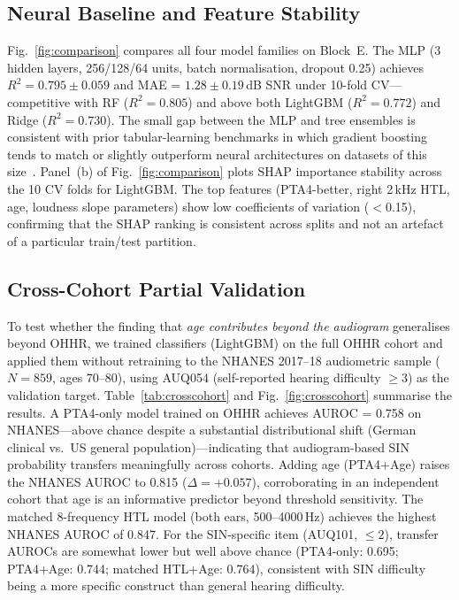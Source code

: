 \documentclass[conference]{IEEEtran}
\begin{document}
\subsection{Neural Baseline and Feature Stability}

Fig.~\ref{fig:comparison} compares all four model families on Block~E.
The MLP (3 hidden layers, 256/128/64 units, batch normalisation, dropout
0.25) achieves $R^2 = 0.795 \pm 0.059$ and MAE = $1.28 \pm 0.19$\,dB SNR
under 10-fold CV---competitive with RF ($R^2=0.805$) and above both
LightGBM ($R^2=0.772$) and Ridge ($R^2=0.730$).  The small gap between the
MLP and tree ensembles is consistent with prior tabular-learning benchmarks
in which gradient boosting tends to match or slightly outperform neural
architectures on datasets of this size~\cite{Gorishniy2021Revisiting}.
Panel~(b) of Fig.~\ref{fig:comparison} plots SHAP importance stability
across the 10 CV folds for LightGBM.  The top features (PTA4-better, right
2\,kHz HTL, age, loudness slope parameters) show low coefficients of
variation ($<$0.15), confirming that the SHAP ranking is consistent across
splits and not an artefact of a particular train/test partition.

\subsection{Cross-Cohort Partial Validation}

To test whether the finding that \emph{age contributes beyond the audiogram}
generalises beyond OHHR, we trained classifiers (LightGBM) on the full OHHR
cohort and applied them without retraining to the NHANES 2017--18 audiometric
sample ($N=859$, ages 70--80), using AUQ054
(self-reported hearing difficulty $\geq$3) as the validation target.
Table~\ref{tab:crosscohort} and Fig.~\ref{fig:crosscohort} summarise the
results.  A PTA4-only model trained on OHHR achieves AUROC = 0.758 on
NHANES---above chance despite a substantial distributional shift (German
clinical vs.\ US general population)---indicating that audiogram-based SIN
probability transfers meaningfully across cohorts.  Adding age (PTA4+Age)
raises the NHANES AUROC to 0.815 ($\Delta = +0.057$), corroborating in an
independent cohort that age is an informative predictor beyond threshold
sensitivity.  The matched 8-frequency HTL model (both ears, 500--4000\,Hz)
achieves the highest NHANES AUROC of 0.847.  For the SIN-specific item
(AUQ101, $\leq 2$), transfer AUROCs are somewhat lower but well above chance
(PTA4-only: 0.695; PTA4+Age: 0.744; matched HTL+Age: 0.764), consistent with
SIN difficulty being a more specific construct than general hearing difficulty.
\end{document}
